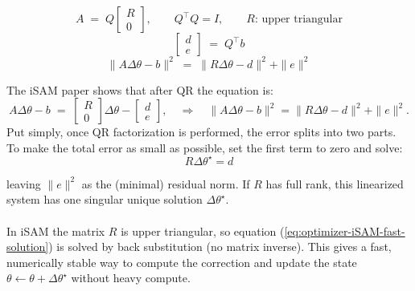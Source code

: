$$
    A \;=\; Q
    \begin{bmatrix}
    R\\[2pt]
    0
    \end{bmatrix},
    \qquad Q^\top Q = I,
    \qquad R \text{: upper triangular}
$$
$$
    \begin{bmatrix}
    d\\ e
    \end{bmatrix}
    \;=\;
    Q^\top b
$$
$$
    \|A\Delta\theta - b\|^2
    \;=\;
    \|R\Delta\theta - d\|^2 + \|e\|^2
$$

\noindent
The iSAM paper \cite{iSAM_paper} shows that after QR the equation is:
$$
    A\Delta\theta - b \;=\;
    \begin{bmatrix} R \\ 0 \end{bmatrix}\Delta\theta -
    \begin{bmatrix} d \\ e \end{bmatrix},
    \quad\Rightarrow\quad
    \|A\Delta\theta - b\|^2 = \|R\Delta\theta - d\|^2 + \|e\|^2.
$$
\noindent
Put simply, once QR factorization is performed, the error splits into two parts. To make the total error as small as possible, set the first term to zero and solve:
\begin{equation}
    R\Delta\theta^\star = d
    \label{eq:optimizer-iSAM-fast-solution}
\end{equation}

\noindent
leaving $\|e\|^2$ as the (minimal) residual norm. If $R$ has full rank, this linearized system has one singular unique solution $\Delta\theta^\star$.
\\ \\
In iSAM the matrix $R$ is upper triangular, so equation (\ref{eq:optimizer-iSAM-fast-solution}) is solved by back substitution (no matrix inverse). This gives a fast, numerically stable way to compute the correction and update the state $\theta \leftarrow \theta + \Delta\theta^\star$ without heavy compute.



